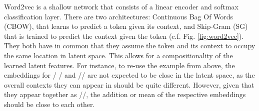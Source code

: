 \documentclass[6pt]{article}
\begin{document}
Word2vec is a shallow network that consists of a linear encoder and softmax classification layer. There are two architectures: Continuous Bag Of Words (CBOW), that learns to predict a token given its context, and Skip-Gram (SG) that is trained to predict the context given the token (c.f. Fig. \ref{fig:word2vec}). They both have in common that they assume the token and its context to occupy the same location in latent space. This allows for a compositionality of the learned latent features. For instance, to re-use the example from above, the embeddings for / / and // are not expected to be close in the latent space, as the overall contexts they can appear in should be quite different. However, given that they appear together as //, the addition or mean of the respective embeddings should be close to each other.
\end{document}
